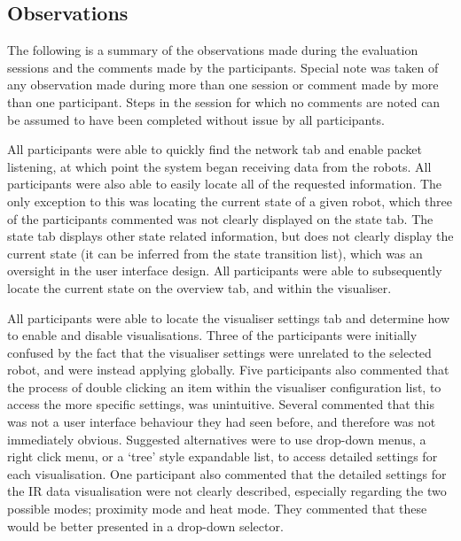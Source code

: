 \subsection{Observations} \label{UserEvaluationObservations}
The following is a summary of the observations made during the evaluation sessions and the comments made by the participants. Special note was taken of any observation made during more than one session or comment made by more than one participant. Steps in the session for which no comments are noted can be assumed to have been completed without issue by all participants.

All participants were able to quickly find the network tab and enable packet listening, at which point the system began receiving data from the robots. All participants were also able to easily locate all of the requested information. The only exception to this was locating the current state of a given robot, which three of the participants commented was not clearly displayed on the state tab. The state tab displays other state related information, but does not clearly display the current state (it can be inferred from the state transition list), which was an oversight in the user interface design. All participants were able to subsequently locate the current state on the overview tab, and within the visualiser.

All participants were able to locate the visualiser settings tab and determine how to enable and disable visualisations. Three of the participants were initially confused by the fact that the visualiser settings were unrelated to the selected robot, and were instead applying globally. Five participants also commented that the process of double clicking an item within the visualiser configuration list, to access the more specific settings, was unintuitive. Several commented that this was not a user interface behaviour they had seen before, and therefore was not immediately obvious. Suggested alternatives were to use drop-down menus, a right click menu, or a `tree' style expandable list, to access detailed settings for each visualisation. One participant also commented that the detailed settings for the IR data visualisation were not clearly described, especially regarding the two possible modes; proximity mode and heat mode. They commented that these would be better presented in a drop-down selector.

